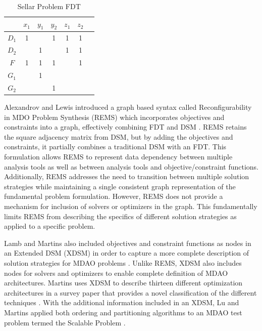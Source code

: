 \begin{table}[htb!]
  \centering
        \caption{Sellar Problem FDT}
        \begin{tabular}{|c|c|c|c|c|c|c|}
            \hline
                   & $x_1$ & $y_1$ & $y_2$ & $z_1$ & $z_2$ \\ \hline
            $D_1$  & 1     &       & 1     & 1     & 1     \\ \hline
            $D_2$  &       & 1     &       & 1     & 1     \\ \hline
            $F$    & 1     & 1     & 1     &       & 1     \\ \hline
            $G_1$  &       & 1     &       &       &       \\ \hline
            $G_2$  &       &       & 1     &       &       \\
            \hline
        \end{tabular}
 \label{t:FDT_simple}
\end{table}%

    Alexandrov and Lewis introduced a graph based syntax called Reconfigurability in 
    MDO Problem Synthesis (REMS) which incorporates objectives and constraints 
    into a graph, effectively combining FDT and DSM \cite{alexandrov2004}. REMS retains the square adjacency 
    matrix from DSM, but by adding the objectives and constraints, it partially 
    combines a traditional DSM with an FDT. This formulation allows REMS to represent data 
    dependency between multiple analysis tools as well as between analysis tools and
    objective/constraint functions. Additionally, REMS addresses the need to
    transition between multiple solution strategies while maintaining a single consistent  
    graph representation of the fundamental problem formulation. However, REMS does not provide 
    a mechanism for inclusion of solvers or optimizers in the graph. This fundamentally limits REMS 
    from describing the specifics of different solution strategies as applied to a specific problem. 

    Lamb and Martins also included objectives and constraint functions as nodes 
    in an Extended DSM (XDSM) in order to capture a more complete description 
    of solution strategies for MDAO problems \cite{Lambe2012}. Unlike REMS, 
    XDSM also includes nodes for solvers and optimizers to enable complete 
    definition of MDAO architectures. Martins uses XDSM to describe thirteen different 
    optimization architectures in a survey paper that provides a novel 
    classification of the different techniques \cite{Lambe2011}. With the 
    additional information included in an XDSM, Lu and Martins applied both 
    ordering and partitioning algorithms to an MDAO test problem termed the 
    Scalable Problem \cite{Lu2012}. 

